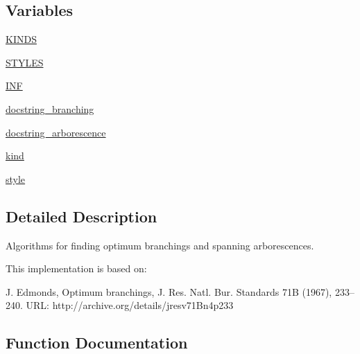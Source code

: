 \subsection*{Variables}
\begin{DoxyCompactItemize}
\item 
\hyperlink{namespacenetworkx_1_1algorithms_1_1tree_1_1branchings_aea8fa46ab01a2d0b7999b47525ccd885}{K\+I\+N\+DS}
\item 
\hyperlink{namespacenetworkx_1_1algorithms_1_1tree_1_1branchings_a5c8765d794c95a0bc2c6b9b15ca5666a}{S\+T\+Y\+L\+ES}
\item 
\hyperlink{namespacenetworkx_1_1algorithms_1_1tree_1_1branchings_aa002e001800aae71afc5df6352bc512f}{I\+NF}
\item 
\hyperlink{namespacenetworkx_1_1algorithms_1_1tree_1_1branchings_a2233d04da53169784a87c032ce01edc2}{docstring\+\_\+branching}
\item 
\hyperlink{namespacenetworkx_1_1algorithms_1_1tree_1_1branchings_a98c2ab6d53d8ccf26d8c17ea7f55a922}{docstring\+\_\+arborescence}
\item 
\hyperlink{namespacenetworkx_1_1algorithms_1_1tree_1_1branchings_a939088c3886c1538f95830ca98488f79}{kind}
\item 
\hyperlink{namespacenetworkx_1_1algorithms_1_1tree_1_1branchings_a09218caf700794f074c73efa336c70f4}{style}
\end{DoxyCompactItemize}


\subsection{Detailed Description}
\begin{DoxyVerb}Algorithms for finding optimum branchings and spanning arborescences.

This implementation is based on:

    J. Edmonds, Optimum branchings, J. Res. Natl. Bur. Standards 71B (1967),
    233–240. URL: http://archive.org/details/jresv71Bn4p233\end{DoxyVerb}
 

\subsection{Function Documentation}
\mbox{\label{namespacenetworkx_1_1algorithms_1_1tree_1_1branchings_a4757ee21411f45850b3efaa62c2fe102}} 
